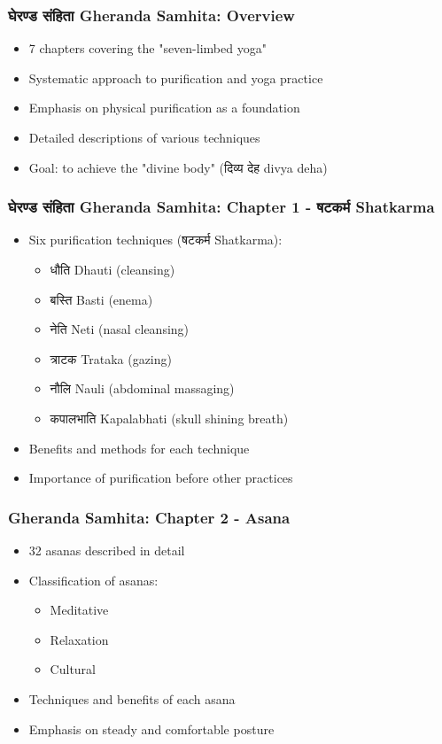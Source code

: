 
\begin{frame}[fragile]\frametitle{घेरण्ड संहिता  Gheranda Samhita: Overview}
\begin{itemize}
    \item 7 chapters covering the "seven-limbed yoga"
    \item Systematic approach to purification and yoga practice
    \item Emphasis on physical purification as a foundation
    \item Detailed descriptions of various techniques
    \item Goal: to achieve the "divine body" (दिव्य देह divya deha)
\end{itemize}
\end{frame}

\begin{frame}[fragile]\frametitle{घेरण्ड संहिता Gheranda Samhita: Chapter 1 - षटकर्म  Shatkarma}
\begin{itemize}
    \item Six purification techniques (षटकर्म  Shatkarma):
    \begin{itemize}
        \item धौति  Dhauti (cleansing)
        \item बस्ति  Basti (enema)
        \item नेति  Neti (nasal cleansing)
        \item त्राटक  Trataka (gazing)
        \item नौलि Nauli (abdominal massaging)
        \item कपालभाति  Kapalabhati (skull shining breath)
    \end{itemize}
    \item Benefits and methods for each technique
    \item Importance of purification before other practices
\end{itemize}
\end{frame}

\begin{frame}[fragile]\frametitle{Gheranda Samhita: Chapter 2 - Asana}
\begin{itemize}
    \item 32 asanas described in detail
    \item Classification of asanas:
    \begin{itemize}
        \item Meditative
        \item Relaxation
        \item Cultural
    \end{itemize}
    \item Techniques and benefits of each asana
    \item Emphasis on steady and comfortable posture
\end{itemize}
\end{frame}

